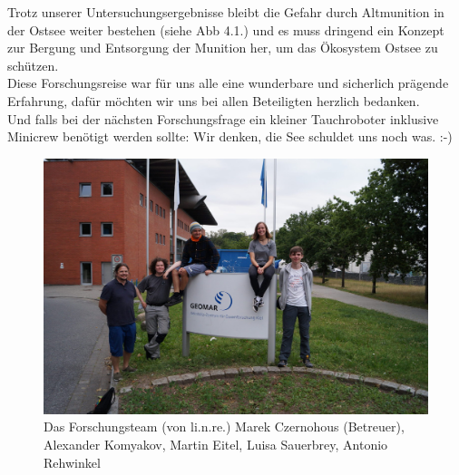 Trotz unserer Untersuchungsergebnisse bleibt die Gefahr durch Altmunition in der Ostsee weiter bestehen (siehe Abb 4.1.) und es muss dringend ein Konzept zur Bergung und Entsorgung der Munition her, um das Ökosystem Ostsee zu schützen.\\

Diese Forschungsreise war für uns alle eine wunderbare und sicherlich prägende Erfahrung, dafür möchten wir uns bei allen Beteiligten herzlich bedanken.\\

Und falls bei der nächsten Forschungsfrage ein kleiner Tauchroboter inklusive Minicrew benötigt werden sollte: Wir denken, die See schuldet uns noch was. :-)

\begin{figure}[htb]
\includegraphics[height=\textheight,%
                   width=\textwidth,%
                   keepaspectratio]{Bilder/ROV/Gruppenfoto}
\caption{Das Forschungsteam (von li.n.re.) Marek Czernohous (Betreuer), Alexander Komyakov, Martin Eitel, Luisa Sauerbrey, Antonio Rehwinkel}
\end{figure}




